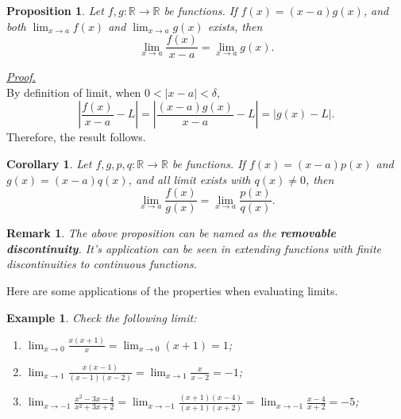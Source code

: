 \documentclass[12pt]{article}
\newtheorem*{corollary}{Corollary}
\newtheorem*{proposition}{Proposition}
\newtheorem*{remark}{Remark}
\newtheorem*{example}{Example}
\renewenvironment{proof}[1][Proof]{\begin{snugshade*} \underline{\textit{{#1}.}}\\}{\hfill \qedsymbol \end{snugshade*}}
\begin{document}
    \begin{proposition}
        Let $f,g:\mathbb{R}\to\mathbb{R}$ be functions. If $f(x)=(x-a)g(x)$, and both $\lim_{x\to a} f(x)$ and $\lim_{x\to a}g(x)$ exists, then \[\lim_{x\to a}\frac{f(x)}{x-a}=\lim_{x\to a}g(x).\]
    \end{proposition}

    \begin{proof}
        By definition of limit, when $0<|x-a|<\delta$, \[|\frac{f(x)}{x-a}-L|=|\frac{(x-a)g(x)}{x-a}-L|=|g(x)-L|.\] Therefore, the result follows.
    \end{proof}

    \begin{corollary}
        Let $f,g,p,q:\mathbb{R}\to\mathbb{R}$ be functions. If $f(x)=(x-a)p(x)$ and $g(x)=(x-a)q(x)$, and all limit exists with $q(x)\neq 0$, then \[\lim_{x\to a}\frac{f(x)}{g(x)}=\lim_{x\to a}\frac{p(x)}{q(x)}.\]
    \end{corollary}

    \begin{remark}
        The above proposition can be named as the \textbf{removable discontinuity}. It's application can be seen in extending functions with finite discontinuities to continuous functions.
    \end{remark}

    Here are some applications of the properties when evaluating limits.

    \begin{example}
        Check the following limit:
        \begin{enumerate}
            \item $\displaystyle \lim_{x\to 0}\frac{x(x+1)}{x}=\lim_{x\to 0}(x+1)=1$;
            \item $\displaystyle \lim_{x\to 1}\frac{x(x-1)}{(x-1)(x-2)}=\lim_{x\to 1}\frac{x}{x-2}=-1$;
            \item $\displaystyle \lim_{x\to -1}\frac{x^2-3x-4}{x^2+3x+2}=\lim_{x\to -1}\frac{(x+1)(x-4)}{(x+1)(x+2)}=\lim_{x\to -1}\frac{x-4}{x+2}=-5$;
        \end{enumerate}
    \end{example}
\end{document}
